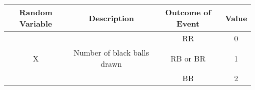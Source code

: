 \begin{tabular}{|c|c|c|c|}
\hline
\textbf{Random Variable}&\textbf{Description}&\textbf{Outcome of Event}&\textbf{Value}\\
\hline
	&	&RR	&0\\\cline{3-4}
X	&Number of black balls drawn	&RB or BR	&1\\\cline{3-4}
	&	&BB	&2\\\hline
\end{tabular}
